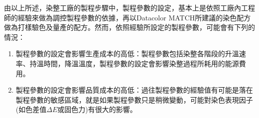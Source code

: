 由以上所述，染整工廠的製程步驟中，製程參數的設定，基本上是依照工廠內工程師的經驗來做為調控製程參數的依據，再以Datacolor MATCH所建議的染色配方做為打樣驗色及量產的配方。然而，依照經驗所設定的製程參數，可能會有下列的情況：
\begin{enumerate}[(1)]
	\item 製程參數的設定會影響生產成本的高低：製程參數包括染整各階段的升溫速率、持溫時間，降溫溫度，製程參數的設定會影響染整過程所耗用的能源費用。
	\item 製程參數的設定會影響品質成本的高低：過往製程參數的經驗值有可能是落在製程參數的敏感區域，就是如果製程參數只是稍微變動，可能對染色表現因子(如色差值$\Delta E$或固色力)有很大的影響。
\end{enumerate}
